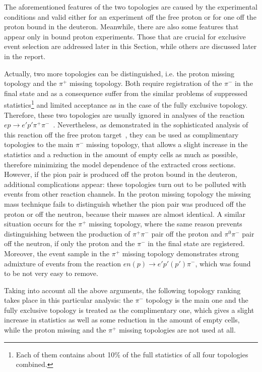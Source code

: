 The aforementioned features of the two topologies are caused by the experimental conditions and valid either for an experiment off the free proton or for one off the proton bound in the deuteron. Meanwhile, there are also some features that appear only in bound proton experiments. Those that are crucial for exclusive event selection are addressed later in this Section, while others are discussed later in the report.%

Actually, two more topologies can be distinguished, i.e. the proton missing topology and the $\pi^{+}$ missing topology. Both require registration of the $\pi^{-}$ in the final state and as a consequence suffer from the similar problems of suppressed statistics\footnote[8]{Each of them contains about 10\% of the full statistics of all four topologies combined.} and limited acceptance as in the case of the fully exclusive topology.  Therefore, these two topologies are usually ignored in analyses of the reaction $ep\rightarrow{}e'p'\pi^{+}\pi^{-}$~\cite{Rip_an_note:2002,Ripani:2002ss,Fed_an_note:2007,Fedotov:2008aa,Isupov:2017lnd}. Nevertheless, as demonstrated in the sophisticated analysis of this reaction off the free proton target~\cite{Fed_an_note:2017,Fed_paper_2018}, they can be used as complimentary topologies to the main $\pi^{-}$ missing topology, that allows a slight increase in the statistics and a reduction in the amount of empty cells as much as possible, therefore minimizing the model dependence of the extracted cross sections. However, if the pion pair is produced off the proton bound in the deuteron, additional complications appear: these topologies turn out to be polluted with events from other reaction channels. In the proton missing topology the missing mass technique fails to distinguish whether the pion pair was produced off the proton or off the neutron, because their masses are almost identical. A similar situation occurs for the $\pi^+$ missing topology, where the same reason prevents distinguishing between the production of $\pi^{+}\pi^{-}$ pair off the proton and $\pi^{0}\pi^{-}$ pair off the neutron, if only the proton and the $\pi^{-}$ in the final state are registered. Moreover, the event sample in the $\pi^+$ missing topology demonstrates strong admixture of events from the reaction $en(p)\rightarrow e'p'(p')\pi^{-}$, which was found to be not very easy to remove.
 
Taking into account all the above arguments, the following topology ranking takes place in this particular analysis: the $\pi^{-}$ topology is the main one and the fully exclusive topology is treated as the complimentary one, which gives a slight increase in statistics as well as some reduction in the amount of empty cells, while the proton missing and the $\pi^{+}$ missing topologies are not used at all.

